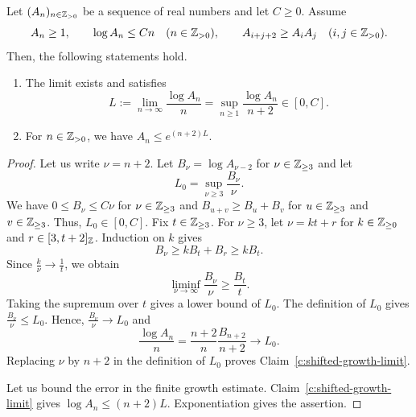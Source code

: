 \begin{lemma}\label{lem:shifted-growth}
Let $(A_n)_{n\in\mathbb Z_{>0}}$ be a sequence of real numbers and let $C\ge0$.
Assume
\[
 A_n\ge1,\qquad \log A_n\le Cn\quad(n\in\mathbb Z_{>0}),\qquad
 A_{i+j+2}\ge A_iA_j\quad(i,j\in\mathbb Z_{>0}).
\]
Then, the following statements hold.
\begin{enumerate}
\item\label{c:shifted-growth-limit} The limit exists and satisfies
\[
 L:=\lim_{n\to\infty}\frac{\log A_n}{n}
   =\sup_{n\ge1}\frac{\log A_n}{n+2}\in[0,C].
\]
\item\label{c:shifted-growth-bound} For $n\in\mathbb Z_{>0}$, we have $A_n\le e^{(n+2)L}$.
\end{enumerate}
\end{lemma}
\begin{proof}
 Let us write $\nu=n+2$.
Let $B_\nu=\log A_{\nu-2}$ for $\nu\in\mathbb Z_{\ge3}$ and let
\[
 L_0=\sup_{\nu\ge3}\frac{B_\nu}{\nu}.
\]
We have $0\le B_\nu\le C\nu$ for $\nu\in\mathbb Z_{\ge3}$ and
$B_{u+v}\ge B_u+B_v$ for $u\in\mathbb Z_{\ge3}$ and $v\in\mathbb Z_{\ge3}$.
Thus, $L_0\in[0,C]$.
Fix $t\in\mathbb Z_{\ge3}$.
For $\nu\ge3$, let $\nu=kt+r$ for $k\in\mathbb Z_{\ge0}$ and $r\in[3,t+2]_{\mathbb Z}$.
Induction on $k$ gives
\[
 B_\nu\ge kB_t+B_r\ge kB_t.
\]
Since $\frac{k}{\nu}\to\frac1t$, we obtain
\[
 \liminf_{\nu\to\infty}\frac{B_\nu}{\nu}\ge\frac{B_t}{t}.
\]
Taking the supremum over $t$ gives a lower bound of $L_0$.
The definition of $L_0$ gives $\frac{B_\nu}{\nu}\le L_0$.
Hence, $\frac{B_\nu}{\nu}\to L_0$ and
\[
 \frac{\log A_n}{n}=\frac{n+2}{n}\frac{B_{n+2}}{n+2}\longrightarrow L_0.
\]
Replacing $\nu$ by $n+2$ in the definition of $L_0$ proves Claim~\ref{c:shifted-growth-limit}.

 Let us bound the error in the finite growth estimate.
Claim~\ref{c:shifted-growth-limit} gives $\log A_n\le(n+2)L$.
Exponentiation gives the assertion.
\end{proof}

